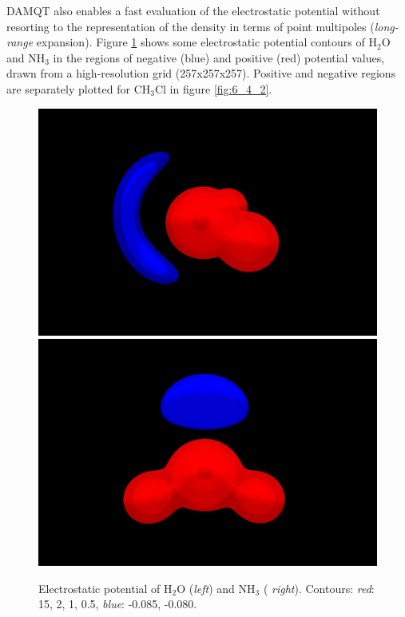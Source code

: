 \documentclass[10pt]{article}
\begin{document}
DAMQT also enables a fast evaluation of the electrostatic potential without
resorting to the representation of the density in terms of point multipoles
({\it long-range} expansion). Figure \ref{fig:6_4_1} shows some
electrostatic potential contours of H$_2$O and NH$_3$ in the regions of
negative (blue) and positive (red) potential values, drawn from a high-resolution grid
(257x257x257). Positive and negative regions are separately plotted for
CH$_3$Cl in figure \ref{fig:6_4_2}.


\vspace*{1cm}
\begin{figure}[H]
\begin{center}
\vspace*{-3mm}
\includegraphics[width=.4\linewidth]{H2O-pot.png}
\hspace*{5mm}
\includegraphics[width=.4\linewidth]{NH3-pot.png}
\end{center}
\caption[Electrostatic potential of H$_2$O]{Electrostatic potential of H$_2$O ({\it left}) and NH$_3$ ({\it
right}). Contours: {\it red}: 15, 2, 1, 0.5, {\it blue}: -0.085, -0.080.
\label{fig:6_4_1}}
\end{figure}
\end{document}
